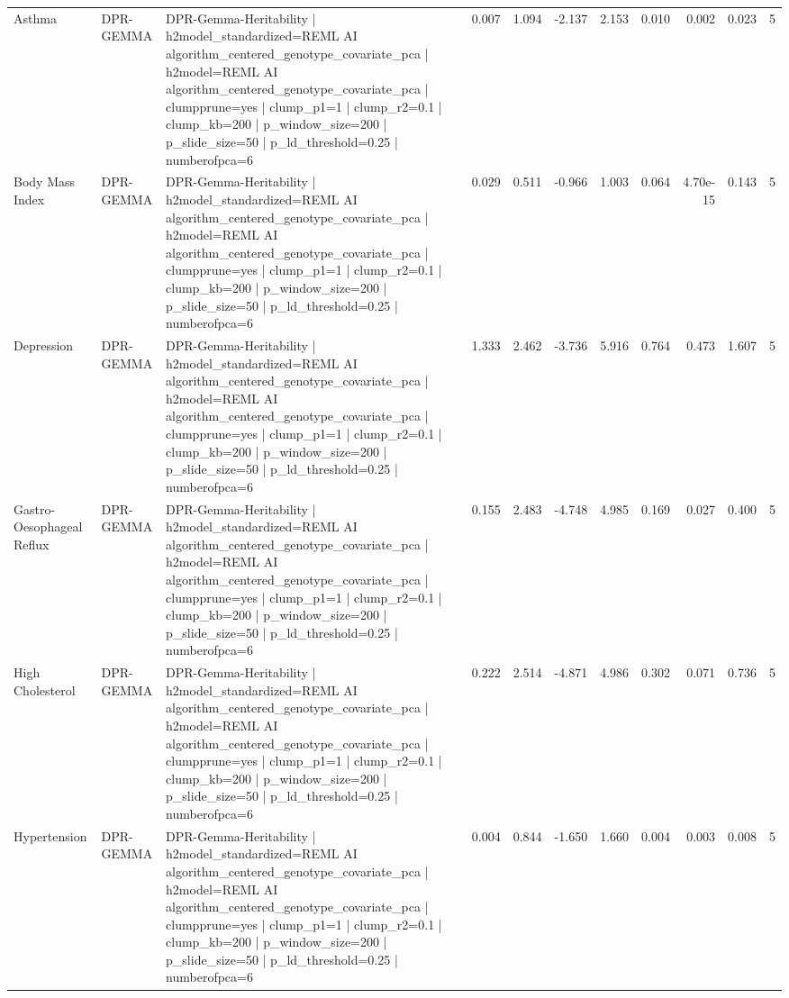\begin{landscape}
\begin{longtable}{p{2.4cm}p{1.8cm}p{6.0cm}rrrrrrrr}
Asthma & DPR-GEMMA & DPR-Gemma-Heritability | h2model\_standardized=REML AI algorithm\_centered\_genotype\_covariate\_pca | h2model=REML AI algorithm\_centered\_genotype\_covariate\_pca | clumpprune=yes | clump\_p1=1 | clump\_r2=0.1 | clump\_kb=200 | p\_window\_size=200 | p\_slide\_size=50 | p\_ld\_threshold=0.25 | numberofpca=6 & 0.007 & 1.094 & -2.137 & 2.153 & 0.010 & 0.002 & 0.023 & 5 \\
Body Mass Index & DPR-GEMMA & DPR-Gemma-Heritability | h2model\_standardized=REML AI algorithm\_centered\_genotype\_covariate\_pca | h2model=REML AI algorithm\_centered\_genotype\_covariate\_pca | clumpprune=yes | clump\_p1=1 | clump\_r2=0.1 | clump\_kb=200 | p\_window\_size=200 | p\_slide\_size=50 | p\_ld\_threshold=0.25 | numberofpca=6 & 0.029 & 0.511 & -0.966 & 1.003 & 0.064 & 4.70e-15 & 0.143 & 5 \\
Depression & DPR-GEMMA & DPR-Gemma-Heritability | h2model\_standardized=REML AI algorithm\_centered\_genotype\_covariate\_pca | h2model=REML AI algorithm\_centered\_genotype\_covariate\_pca | clumpprune=yes | clump\_p1=1 | clump\_r2=0.1 | clump\_kb=200 | p\_window\_size=200 | p\_slide\_size=50 | p\_ld\_threshold=0.25 | numberofpca=6 & 1.333 & 2.462 & -3.736 & 5.916 & 0.764 & 0.473 & 1.607 & 5 \\
Gastro-Oesophageal Reflux & DPR-GEMMA & DPR-Gemma-Heritability | h2model\_standardized=REML AI algorithm\_centered\_genotype\_covariate\_pca | h2model=REML AI algorithm\_centered\_genotype\_covariate\_pca | clumpprune=yes | clump\_p1=1 | clump\_r2=0.1 | clump\_kb=200 | p\_window\_size=200 | p\_slide\_size=50 | p\_ld\_threshold=0.25 | numberofpca=6 & 0.155 & 2.483 & -4.748 & 4.985 & 0.169 & 0.027 & 0.400 & 5 \\
High Cholesterol & DPR-GEMMA & DPR-Gemma-Heritability | h2model\_standardized=REML AI algorithm\_centered\_genotype\_covariate\_pca | h2model=REML AI algorithm\_centered\_genotype\_covariate\_pca | clumpprune=yes | clump\_p1=1 | clump\_r2=0.1 | clump\_kb=200 | p\_window\_size=200 | p\_slide\_size=50 | p\_ld\_threshold=0.25 | numberofpca=6 & 0.222 & 2.514 & -4.871 & 4.986 & 0.302 & 0.071 & 0.736 & 5 \\
Hypertension & DPR-GEMMA & DPR-Gemma-Heritability | h2model\_standardized=REML AI algorithm\_centered\_genotype\_covariate\_pca | h2model=REML AI algorithm\_centered\_genotype\_covariate\_pca | clumpprune=yes | clump\_p1=1 | clump\_r2=0.1 | clump\_kb=200 | p\_window\_size=200 | p\_slide\_size=50 | p\_ld\_threshold=0.25 | numberofpca=6 & 0.004 & 0.844 & -1.650 & 1.660 & 0.004 & 0.003 & 0.008 & 5 \\

\end{longtable}
\end{landscape}
